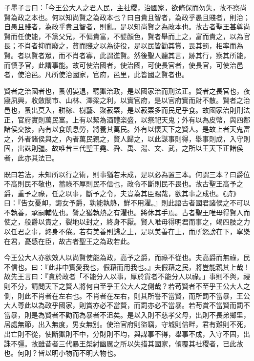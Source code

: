 
\begin{pinyinscope}
子墨子言曰：「今王公大人之君人民，主社稷，治國家，欲脩保而勿失，故不察尚賢為政之本也。何以知尚賢之為政本也？曰自貴且智者，為政乎愚且賤者，則治；自愚且賤者，為政乎貴且智者，則亂。是以知尚賢之為政本也。故古者聖王甚尊尚賢而任使能，不黨父兄，不偏貴富，不嬖顏色，賢者舉而上之，富而貴之，以為官長；不肖者抑而廢之，貧而賤之以為徒役，是以民皆勸其賞，畏其罰，相率而為賢。者以賢者眾，而不肖者寡，此謂進賢。然後聖人聽其言，跡其行，察其所能，而慎予官，此謂事能。故可使治國者，使治國，可使長官者，使長官，可使治邑者，使治邑。凡所使治國家，官府，邑里，此皆國之賢者也。

賢者之治國者也，蚤朝晏退，聽獄治政，是以國家治而刑法正。賢者之長官也，夜寢夙興，收斂關市、山林、澤梁之利，以實官府，是以官府實而財不散。賢者之治邑也，蚤出莫入，耕稼、樹藝、聚菽粟，是以菽粟多而民足乎食。故國家治則刑法正，官府實則萬民富。上有以絜為酒醴栥盛，以祭祀天鬼；外有以為皮幣，與四鄰諸侯交接，內有以食飢息勞，將養其萬民。外有以懷天下之賢人。是故上者天鬼富之，外者諸侯與之，內者萬民親之，賢人歸之，以此謀事則得，舉事則成，入守則固，出誅則彊。故唯昔三代聖王堯、舜、禹、湯、文、武，之所以王天下正諸侯者，此亦其法已。

既曰若法，未知所以行之術，則事猶若未成，是以必為置三本。何謂三本？曰爵位不高則民不敬也，蓄祿不厚則民不信也，政令不斷則民不畏也。故古聖王高予之爵，重予之祿，任之以事，斷予之令，夫豈為其臣賜哉，欲其事之成也。《詩》曰：『告女憂卹，誨女予爵，孰能執熱，鮮不用濯。』則此語古者國君諸侯之不可以不執善，承嗣輔佐也。譬之猶執熱之有濯也。將休其手焉。古者聖王唯毋得賢人而使之，般爵以貴之，裂地以封之，終身不厭。賢人唯毋得明君而事之，竭四肢之力以任君之事，終身不倦。若有美善則歸之上，是以美善在上，而所怨謗在下，寧樂在君，憂慼在臣，故古者聖王之為政若此。

今王公大人亦欲效人以尚賢使能為政，高予之爵，而祿不從也。夫高爵而無祿，民不信也。曰：『此非中實愛我也，假藉而用我也。』夫假藉之民，將豈能親其上哉！故先王言曰：『貪於政者「不能分人以事，厚於貨者不能分人以祿。」事則不與，祲則不分，請問天下之賢人將何自至乎王公大人之側哉？若苟賢者不至乎王公大人之側，則此不肖者在左右也。不肖者在左右，則其所譽不當賢，而所罰不當暴，王公大人尊此以為政乎國家，則賞亦必不當賢，而罰亦必不當暴。若苟賞不當賢而罰不當暴，則是為賢者不勸而為暴者不沮矣。是以入則不慈孝父母，出則不長弟鄉里，居處無節，出入無度，男女無別。使治官府則盜竊，守城則倍畔，君有難則不死，出亡則不從，使斷獄則不中，分財則不均，與謀事不得，舉事不成，入守不固，出誅不彊。故雖昔者三代暴王桀紂幽厲之所以失措其國家，傾覆其社稷者，已此故也。何則？皆以明小物而不明大物也。


\end{pinyinscope}

